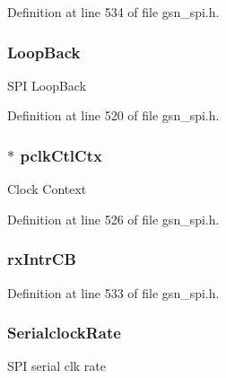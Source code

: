 Definition at line 534 of file gsn\_\-spi.h.

\hypertarget{a00231_a82d6f7f94ead0563d493532a0fc8082e}{
\subsubsection[{LoopBack}]{ {\bf LoopBack}}}
\label{a00231_a82d6f7f94ead0563d493532a0fc8082e}
SPI LoopBack 

Definition at line 520 of file gsn\_\-spi.h.

\hypertarget{a00231_a87fd9dda5636bd71a412693b96fed177}{
\subsubsection[{pclkCtlCtx}]{$\ast$ {\bf pclkCtlCtx}}}
\label{a00231_a87fd9dda5636bd71a412693b96fed177}
Clock Context 

Definition at line 526 of file gsn\_\-spi.h.

\hypertarget{a00231_a764a17416df305e000c7f2c5d3edf2c2}{
\subsubsection[{rxIntrCB}]{ {\bf rxIntrCB}}}
\label{a00231_a764a17416df305e000c7f2c5d3edf2c2}


Definition at line 533 of file gsn\_\-spi.h.

\hypertarget{a00231_aceb3f680c7de4959ad53b0e20baf8a5c}{
\subsubsection[{SerialclockRate}]{ {\bf SerialclockRate}}}
\label{a00231_aceb3f680c7de4959ad53b0e20baf8a5c}
SPI serial clk rate 

